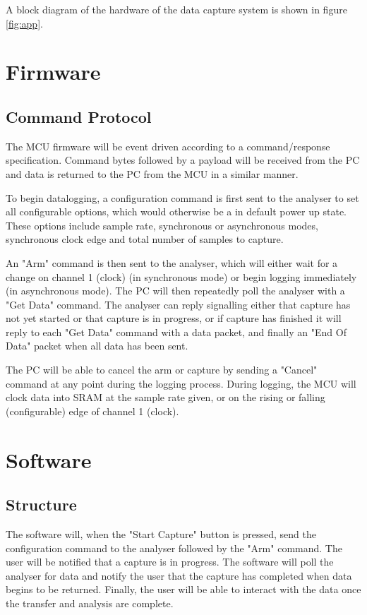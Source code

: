 \documentclass[11pt]{article}
\begin{document}
    A block diagram of the hardware of the data capture system is shown in figure \ref{fig:app}.
    
\section{Firmware}
\subsection{Command Protocol}
    The MCU firmware will be event driven according to a command/response
    specification. Command bytes followed by a payload will be received from the
    PC and data is returned to the PC from the MCU in a similar manner.
    
    To begin datalogging, a configuration command is first sent to the analyser
    to set all configurable options, which would otherwise be a in default power
    up state. These options include sample rate, synchronous or asynchronous
    modes, synchronous clock edge and total number of samples to capture.

    An "Arm" command is then sent to the analyser, which will either wait
    for a change on channel 1 (clock) (in synchronous mode) or begin logging
    immediately (in asynchronous mode). The PC will then repeatedly poll the
    analyser with a "Get Data" command.  The analyser can reply signalling either
    that capture has not yet started or that capture is in progress, or if capture
    has finished it will reply to each "Get Data" command with a data packet, and
    finally an "End Of Data" packet when all data has been sent.
    
    The PC will be able to cancel the arm or capture by sending a "Cancel"
    command at any point during the logging process. During
    logging, the MCU will clock data into SRAM at the sample rate given, or on
    the rising or falling (configurable) edge of channel 1 (clock).


\section{Software}
\subsection{Structure}

The software will, when the "Start Capture" button is pressed, send the
    configuration command to the analyser followed by the "Arm" command.  The
    user will be notified that a capture is in progress.  The software will poll
    the analyser for data and notify the user that the capture has completed when
    data begins to be returned.  Finally, the user will be able to interact with
    the data once the transfer and analysis are complete.
\end{document}
